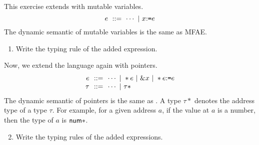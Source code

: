 \begin{exercise}

This exercise extends \Lang with mutable variables.
  \[ e\ ::=\ \cdots\ |\ x{:}\texttt{=} e \]
    The dynamic semantic of mutable variables is the same as \textsf{MFAE}.
\begin{enumerate}
  \item Write the typing rule of the added expression.
\end{enumerate}
Now, we extend the language again with pointers.
\[
  \begin{array}{r@{~~}r@{~~}l}
    e & ::= & \cdots\ |\ \ast e \ |\ \& x\ |\ \ast\eset{e}{e} \\
    \tau & ::= & \cdots\ |\ \tau\ast
  \end{array}
\]
The dynamic semantic of pointers is the same as .
A type $\tau\ast$ denotes the address type of a type $\tau$.
For example, for a given address $a$, if the value at $a$ is a number,
then the type of $a$ is $\textsf{num}\ast$.

\begin{enumerate}
  \setcounter{enumi}{1}
  \item Write the typing rules of the added expressions.
\end{enumerate}

\end{exercise}
